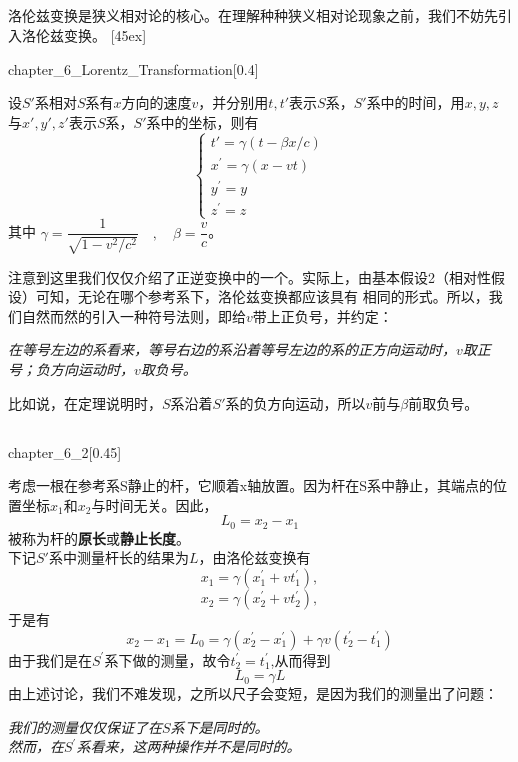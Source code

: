 \subsection[洛伦兹变换]{}
洛伦兹变换是狭义相对论的核心。在理解种种狭义相对论现象之前，我们不妨先引入洛伦兹变换。
[45ex]
\begin{law}
	\begin{singlefigure}[洛伦兹变换]{chapter_6_Lorentz_Transformation}[0.4]
	\end{singlefigure}
	设$S'$系相对$S$系有$x$方向的速度$v$，并分别用$t,t'$表示$S$系，$S'$系中的时间，用$x,y,z$与$x',y',z'$表示$S$系，$S'$系中的坐标，则有
	\[
		\left\{
			\begin{array}{l}
				t'=\gamma(t-\beta x/c)\\
				x^{\prime}=\gamma(x-vt)\\
				y^{\prime}=y\\
				z^{\prime}=z
			\end{array}
		\right.
	\]
	其中 $\gamma = \dfrac{1}{\sqrt{1-v^2/c^2}} \quad,\quad\beta=\dfrac{v}{c}$。
\end{law}

注意到这里我们仅仅介绍了正逆变换中的一个。实际上，由基本假设2（相对性假设）可知，无论在哪个参考系下，洛伦兹变换都应该具有
相同的形式。所以，我们自然而然的引入一种符号法则，即给$v$带上正负号，并约定：
\begin{center}
	\itshape 在等号左边的系看来，等号右边的系沿着等号左边的系的正方向运动时，$v$取正号；负方向运动时，$v$取负号。
\end{center}

比如说，在定理说明时，$S$系沿着$S'$系的负方向运动，所以$v$前与$\beta$前取负号。
\subsection[动尺收缩]{}
\begin{singlefigure}{chapter_6_2}[0.45]
\end{singlefigure}
考虑一根在参考系S静止的杆，它顺着x轴放置。因为杆在S系中静止，其端点的位置坐标$x_1$和$x_2$与时间无关。因此，
\[L_0=x_2-x_1\]
被称为杆的\textbf{原长}或\textbf{静止长度}。\\
下记$S'$系中测量杆长的结果为$L$，由洛伦兹变换有
\[x_{1}=\gamma\left(x_{1}^{\prime}+vt_{1}^{\prime}\right), \]
\[x_{2}=\gamma\left(x_{2}^{\prime}+vt_{2}^{\prime}\right), \]
于是有
\[x_{2}-x_{1}=L_{0}=\gamma\left(x_{2}^{\prime}-x_{1}^{\prime}\right)+\gamma v\left(t_{2}^{\prime}-t_{1}^{\prime}\right) \]
由于我们是在$S^{\prime}$系下做的测量，故令$t_{2}^{\prime}=t_{1}^{\prime}$,从而得到
\[L_0=\gamma L\]
由上述讨论，我们不难发现，之所以尺子会变短，是因为我们的测量出了问题：
\begin{center}
	\itshape 我们的测量仅仅保证了在$S$系下是同时的。\\然而，在$S^{\prime}$系看来，这两种操作并不是同时的。
\end{center}

